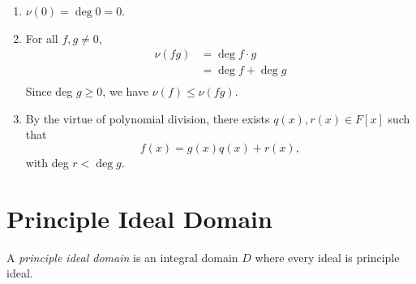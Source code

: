 \begin{explanation}
    \begin{enumerate}
        \item $\nu(0) = \deg 0 = 0$.
        \item For all $f, g \neq 0$, \begin{align*}
            \nu(fg) &= \deg f \cdot g\\
                    &= \deg f + \deg g\\
        \end{align*}
        Since deg $g \ge 0$, we have $\nu(f) \le \nu(fg)$.
        \item By the virtue of polynomial division, there exists $q(x), r(x) \in F[x]$ such that \[f(x) = g(x)q(x) + r(x),\] with deg $r < \deg g$.
    \end{enumerate}
\end{explanation}
\section{Principle Ideal Domain}
\begin{definition}
    A \textit{principle ideal domain} is an integral domain $D$ where every ideal is principle ideal.
\end{definition}